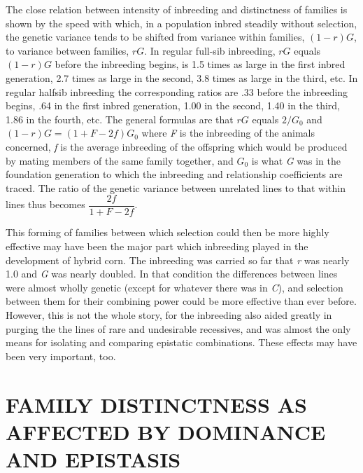 The close relation between intensity of inbreeding and distinctness
of families is shown by the speed with which, in a population inbred
steadily without selection, the genetic variance tends to be shifted from
variance within families, $(1 - r)G$, to variance between families, $rG$. In
regular full-sib inbreeding, $rG$ equals $(1 - r)G$ before the inbreeding
begins, is 1.5 times as large in the first inbred generation, 2.7 times as
large in the second, 3.8 times as large in the third, etc. In regular halfsib
inbreeding the corresponding ratios are .33 before the inbreeding
begins, .64 in the first inbred generation, 1.00 in the second, 1.40 in the
third, 1.86 in the fourth, etc. The general formulas are that $rG$ equals
$2/G_0$ and $(1 -r)G = (1 + F - 2f)G_0$ where \textit{F} is the inbreeding of the
animals concerned, \textit{f} is the average inbreeding of the offspring which
would be produced by mating members of the same family together,
and $G_0$ is what \textit{G} was in the foundation generation to which the
inbreeding and relationship coefficients are traced. The ratio of the
genetic variance between unrelated lines to that within lines thus
becomes $\dfrac{2f}{1 + F - 2f}$.

This forming of families between which selection could then be
more highly effective may have been the major part which inbreeding
played in the development of hybrid corn. The inbreeding was carried
so far that \textit{r} was nearly 1.0 and \textit{G} was nearly doubled. In that condition
the differences between lines were almost wholly genetic (except for
whatever there was in \textit{C}), and selection between them for their combining
power could be more effective than ever before. However, this is not
the whole story, for the inbreeding also aided greatly in purging the
the lines of rare and undesirable recessives, and was almost the only
means for isolating and comparing epistatic combinations. These effects
may have been very important, too.

\section*{FAMILY DISTINCTNESS AS AFFECTED BY DOMINANCE AND EPISTASIS}

